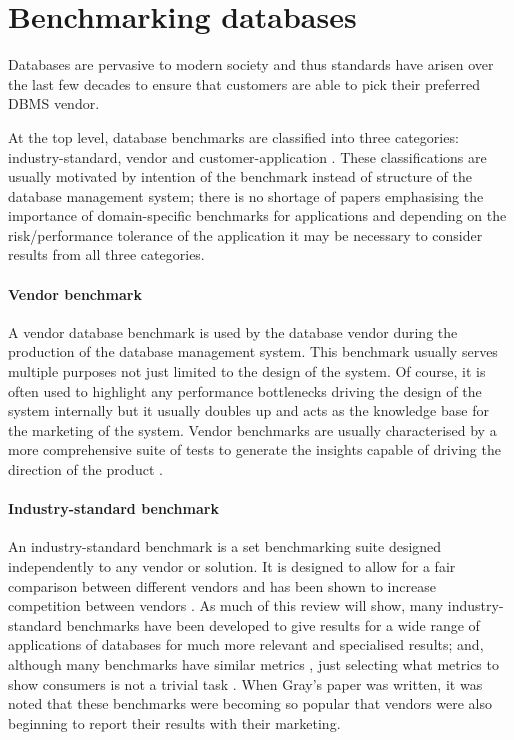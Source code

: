 \section{Benchmarking databases}
Databases are pervasive to modern society and thus standards have arisen over
the last few decades to ensure that customers are able to pick their preferred
DBMS vendor.

At the top level, database benchmarks are classified into three categories: industry-standard, vendor and
customer-application \cite{PractitionersIntroduction}. 
These classifications are usually motivated by intention of the benchmark
instead of structure of the database management system; there is no shortage of
papers emphasising the importance of domain-specific benchmarks for applications
\cite{PractitionersIntroduction, BenchmarkHandbook} and depending on the
risk/performance tolerance of the application it may be necessary to consider
results from all three categories.

\paragraph{Vendor benchmark} A vendor database benchmark is used by
the database vendor during the production of the database management system.
This benchmark usually serves multiple purposes not just limited to the design
of the system. Of course, it is often used to highlight any performance
bottlenecks driving the design of the system internally but it usually doubles
up and acts as the knowledge base for the marketing of the system. Vendor
benchmarks are usually characterised by a more comprehensive suite of
tests to generate the insights capable of driving the direction of the
product \cite{PractitionersIntroduction}.

\paragraph{Industry-standard benchmark} An industry-standard benchmark is a set
benchmarking suite designed independently to any vendor or solution. It is
designed to allow for a fair comparison between different vendors and has been
shown to increase competition between vendors \cite{Wisconsin2}. As much of
this review will show, many industry-standard benchmarks have been developed
to give results for a wide range of applications of databases for much more
relevant and specialised results; and, although many benchmarks have similar
metrics \cite{SetQueryBenchmark, DebitCredit}, just selecting what metrics to
show consumers is not a trivial task \cite{DebitCredit}. When Gray's paper
\cite{BenchmarkHandbook} was written, it was noted that these benchmarks were
becoming so popular that vendors were also beginning to report their results
with their marketing.

